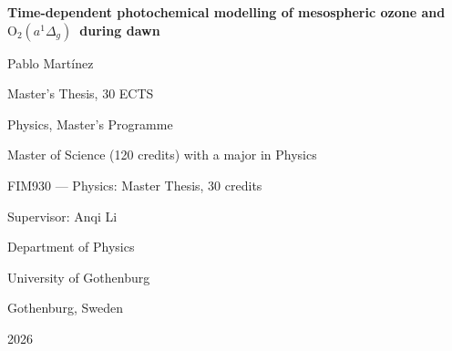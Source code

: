 \documentclass[12pt,a4paper,oneside]{report}
\newcommand{\singlet}{\ensuremath{\mathrm{O}_2(a^1\Delta_g)}}
\begin{document}
\hypersetup{pageanchor=false}
\begin{titlepage}\centering
\vspace*{1cm}
{\LARGE\bfseries Time-dependent photochemical modelling of mesospheric ozone and \singlet\ during dawn\par}
\vspace{1.5cm}
{\Large Pablo Mart\'inez\par}
\vspace{1cm}
{\large Master's Thesis, 30 ECTS\par}
\vspace{0.5cm}
Physics, Master's Programme\par
\vspace{0.5cm}
Master of Science (120 credits) with a major in Physics\par
\vspace{0.5cm}
FIM930 --- Physics: Master Thesis, 30 credits\par
\vspace{1cm}
Supervisor: Anqi Li\par
\vfill
Department of Physics\par
University of Gothenburg\par
\vspace{0.7cm}
Gothenburg, Sweden\par
2026\par
\end{titlepage}
\hypersetup{pageanchor=true}

\tableofcontents\listoffigures\listoftables
\clearpage{}










\appendix


\begingroup
\singlespacing

\endgroup
\end{document}
